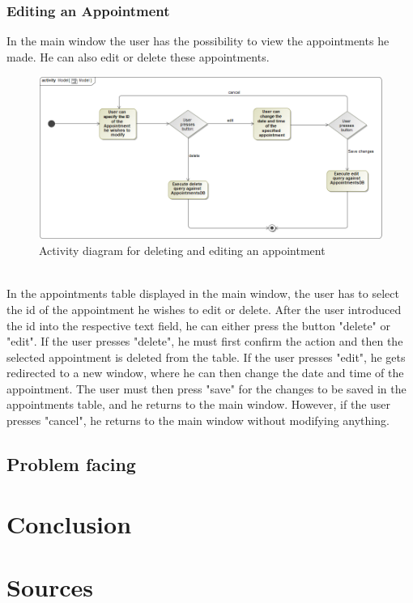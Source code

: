 \documentclass[a4paper, 12pt]{report}
\begin{document}
\subsection{Editing an Appointment}
In the main window the user has the possibility to view the appointments he made. He can also edit or delete these appointments.
\begin{figure}[!h]
\includegraphics[width=\linewidth]{acImg.png} 
\caption{Activity diagram for deleting and editing an appointment}
\end{figure}
\\In the appointments table displayed in the main window, the user has to select the id of the appointment he wishes to edit or delete. After the user introduced the id into the respective text field, he can either press the button "delete" or "edit". If the user presses "delete", he must first confirm the action and then the selected appointment is deleted from the table. If the user presses "edit", he gets redirected to a new window, where he can then change the date and time of the appointment. The user must then press "save" for the changes to be saved in the appointments table, and he returns to the main window. However, if the user presses "cancel", he returns to the main window without modifying anything.

\section{Problem facing}

\chapter{Conclusion}

\chapter{Sources}
\end{document}
